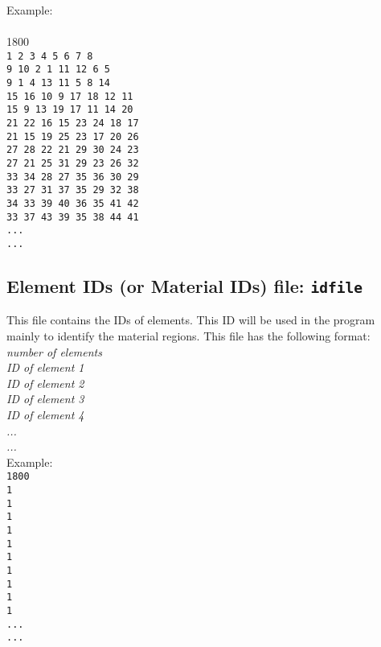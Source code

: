 Example:\\\\
1800\\
\texttt{1 2 3 4 5 6 7 8 \\
9 10 2 1 11 12 6 5 \\
9 1 4 13 11 5 8 14 \\
15 16 10 9 17 18 12 11 \\
15 9 13 19 17 11 14 20 \\
21 22 16 15 23 24 18 17 \\
21 15 19 25 23 17 20 26 \\
27 28 22 21 29 30 24 23 \\
27 21 25 31 29 23 26 32 \\
33 34 28 27 35 36 30 29 \\
33 27 31 37 35 29 32 38 \\
34 33 39 40 36 35 41 42 \\
33 37 43 39 35 38 44 41 \\
...\\
...\\}

\subsection{Element IDs (or Material IDs) file: \texttt{idfile}}


This file contains the IDs of elements. This ID will be used in the program mainly to identify the material regions. This file has the following format: \\

\emph{number of elements\\
ID of element 1\\
ID of element 2\\
ID of element 3\\
ID of element 4\\
...\\
...}\\

Example:\\

\texttt{1800\\
1\\
1\\
1\\
1\\
1\\
1\\
1\\
1\\
1\\
1\\
...\\
...\\}

